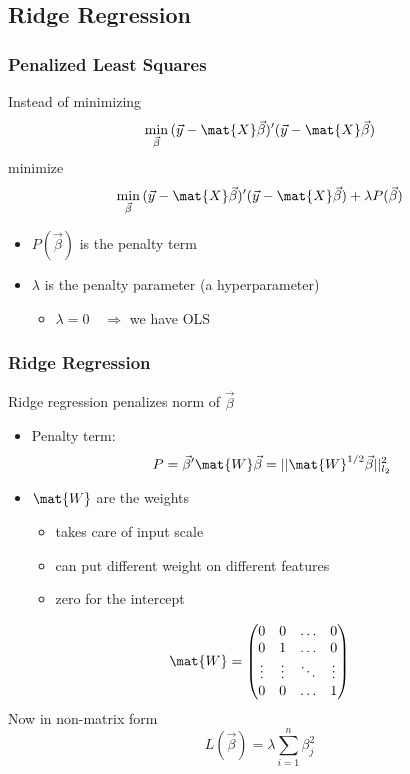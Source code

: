 \documentclass[mathserif, xcolor=table, svgnames]{beamer}
\begin{document}
\subsection{Ridge Regression}
\frame{\tableofcontents[currentsubsection]}

\begin{frame}
  \frametitle{Penalized Least Squares}
  Instead of minimizing 
  \begin{equation*}
    \min_{\vec{\beta}} \, (\vec{y} - \mat{X}\vec{\beta})'(\vec{y} - \mat{X}\vec{\beta})
  \end{equation*}
  minimize
  \begin{equation*}
    \min_{\vec{\beta}} \, (\vec{y} - \mat{X}\vec{\beta})'(\vec{y} - \mat{X}\vec{\beta})
    + 
    \lambda P(\vec{\beta})
  \end{equation*}
  \begin{itemize}
  \item $P(\vec{\beta})$ is the penalty term
  \item $\lambda$ is the penalty parameter (a hyperparameter)
    \begin{itemize}
    \item $\lambda = 0 \quad \Rightarrow$ we have OLS
    \end{itemize}
  \end{itemize}
\end{frame}

\begin{frame}
  \frametitle{Ridge Regression}
  Ridge regression penalizes norm of $\vec{\beta}$
  \begin{itemize}
  \item Penalty term:
    \begin{equation*}
      P = \vec{\beta}' \mat{W} \vec{\beta}
      =
      || \mat{W}^{1/2} \vec{\beta} ||_{l_{2}}^{2}
    \end{equation*}
  \item $\mat{W}$ are the weights
    \begin{itemize}
    \item takes care of input scale
    \item can put different weight on different features
    \item zero for the intercept
    \end{itemize}
  \end{itemize}
  \begin{equation}
    \mat{W} =
    \begin{pmatrix}
      0 & 0 & \hdots & 0\\
      0 & 1 & \hdots & 0\\
      \vdots & \vdots &\ddots&\vdots\\
      0 & 0 & \hdots & 1\\
    \end{pmatrix}
  \end{equation}
  Now in non-matrix form
  \begin{equation*}
    L(\vec{\beta}) = \lambda \sum_{i=1}^{n} \beta_{j}^{2}
  \end{equation*}
\end{frame}
\end{document}

